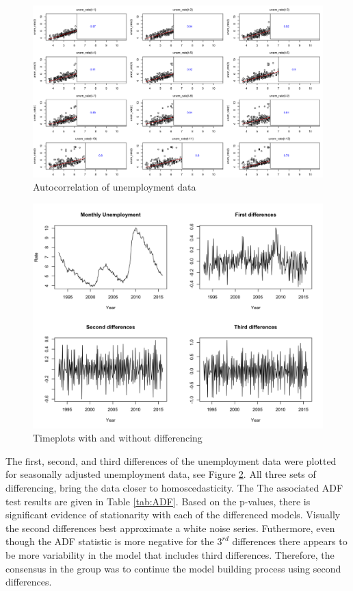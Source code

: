 \documentclass[twoside,twocolumn]{article}
\begin{document}
						\begin{figure}[H]
		\centering
		\caption{Autocorrelation of unemployment data}
		\label{fig:laggedunemployment}
		\includegraphics[width=\linewidth]{images/laggedunemployment}
	\end{figure}
			


					\begin{figure}[H]
		\centering
		\caption{Timeplots with and without differencing}
		\label{fig:seasonalunem}
		\includegraphics[width=\linewidth]{images/seasonalunem}
	\end{figure}

The first, second, and third differences of the unemployment data were plotted for seasonally adjusted unemployment data, see Figure \ref{fig:seasonalunem}. All three sets of differencing, bring the data closer to homoscedasticity. The  The associated ADF test results are given in Table \ref{tab:ADF}. Based on the p-values, there is significant evidence of stationarity with each of the differenced models. Visually the second differences best approximate a white noise series. Futhermore, even though the ADF statistic is more negative for the \(3^{rd}\) differences there appears to be more variability in the model that includes third differences.  Therefore, the consensus in the group was to continue the model building process using second differences.
\end{document}
